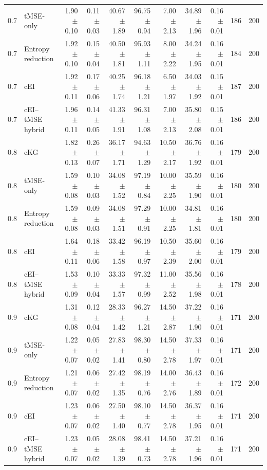 \begin{tabular}{@{}clrrrrrrrrr@{}}
0.7 & tMSE-only & 1.90 $\pm$ 0.10 & 0.11 $\pm$ 0.03 & 40.67 $\pm$ 1.89 & 96.75 $\pm$ 0.94 & 7.00 $\pm$ 2.13 & 34.89 $\pm$ 1.96 & 0.16 $\pm$ 0.01 & 186 & 200 \\
0.7 & Entropy reduction & 1.92 $\pm$ 0.10 & 0.15 $\pm$ 0.04 & 40.50 $\pm$ 1.81 & 95.93 $\pm$ 1.11 & 8.00 $\pm$ 2.22 & 34.24 $\pm$ 1.95 & 0.16 $\pm$ 0.01 & 184 & 200 \\
0.7 & cEI & 1.92 $\pm$ 0.11 & 0.17 $\pm$ 0.06 & 40.25 $\pm$ 1.74 & 96.18 $\pm$ 1.21 & 6.50 $\pm$ 1.97 & 34.03 $\pm$ 1.92 & 0.15 $\pm$ 0.01 & 187 & 200 \\
0.7 & cEI--tMSE hybrid & 1.96 $\pm$ 0.11 & 0.14 $\pm$ 0.05 & 41.33 $\pm$ 1.91 & 96.31 $\pm$ 1.08 & 7.00 $\pm$ 2.13 & 35.80 $\pm$ 2.08 & 0.15 $\pm$ 0.01 & 186 & 200 \\
0.8 & cKG & 1.82 $\pm$ 0.13 & 0.26 $\pm$ 0.07 & 36.17 $\pm$ 1.71 & 94.63 $\pm$ 1.29 & 10.50 $\pm$ 2.17 & 36.76 $\pm$ 1.92 & 0.16 $\pm$ 0.01 & 179 & 200 \\
0.8 & tMSE-only & 1.59 $\pm$ 0.08 & 0.10 $\pm$ 0.03 & 34.08 $\pm$ 1.52 & 97.19 $\pm$ 0.84 & 10.00 $\pm$ 2.25 & 35.59 $\pm$ 1.90 & 0.16 $\pm$ 0.01 & 180 & 200 \\
0.8 & Entropy reduction & 1.59 $\pm$ 0.08 & 0.09 $\pm$ 0.03 & 34.08 $\pm$ 1.51 & 97.29 $\pm$ 0.91 & 10.00 $\pm$ 2.25 & 34.81 $\pm$ 1.81 & 0.16 $\pm$ 0.01 & 180 & 200 \\
0.8 & cEI & 1.64 $\pm$ 0.11 & 0.18 $\pm$ 0.06 & 33.42 $\pm$ 1.58 & 96.19 $\pm$ 0.97 & 10.50 $\pm$ 2.39 & 35.60 $\pm$ 2.00 & 0.16 $\pm$ 0.01 & 179 & 200 \\
0.8 & cEI--tMSE hybrid & 1.53 $\pm$ 0.09 & 0.10 $\pm$ 0.04 & 33.33 $\pm$ 1.57 & 97.32 $\pm$ 0.99 & 11.00 $\pm$ 2.52 & 35.56 $\pm$ 1.98 & 0.16 $\pm$ 0.01 & 178 & 200 \\
0.9 & cKG & 1.31 $\pm$ 0.08 & 0.12 $\pm$ 0.04 & 28.33 $\pm$ 1.42 & 96.27 $\pm$ 1.21 & 14.50 $\pm$ 2.87 & 37.22 $\pm$ 1.90 & 0.16 $\pm$ 0.01 & 171 & 200 \\
0.9 & tMSE-only & 1.22 $\pm$ 0.07 & 0.05 $\pm$ 0.02 & 27.83 $\pm$ 1.41 & 98.30 $\pm$ 0.80 & 14.50 $\pm$ 2.78 & 37.33 $\pm$ 1.97 & 0.16 $\pm$ 0.01 & 171 & 200 \\
0.9 & Entropy reduction & 1.21 $\pm$ 0.07 & 0.06 $\pm$ 0.02 & 27.42 $\pm$ 1.35 & 98.19 $\pm$ 0.76 & 14.00 $\pm$ 2.76 & 36.43 $\pm$ 1.89 & 0.16 $\pm$ 0.01 & 172 & 200 \\
0.9 & cEI & 1.23 $\pm$ 0.07 & 0.06 $\pm$ 0.02 & 27.50 $\pm$ 1.40 & 98.10 $\pm$ 0.77 & 14.50 $\pm$ 2.78 & 36.37 $\pm$ 1.95 & 0.16 $\pm$ 0.01 & 171 & 200 \\
0.9 & cEI--tMSE hybrid & 1.23 $\pm$ 0.07 & 0.05 $\pm$ 0.02 & 28.08 $\pm$ 1.39 & 98.41 $\pm$ 0.73 & 14.50 $\pm$ 2.78 & 37.21 $\pm$ 1.96 & 0.16 $\pm$ 0.01 & 171 & 200 \\
\bottomrule
\end{tabular}

